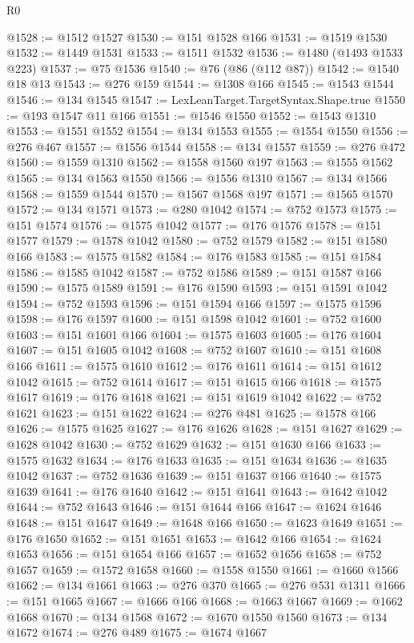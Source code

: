 \begin{lexlean}{R0}
\begin{coremodule}
@1528 := @1512 @1527
@1530 := @151 @1528 @166
@1531 := @1519 @1530
@1532 := @1449 @1531
@1533 := @1511 @1532
@1536 := @1480 (@1493 @1533 @223)
@1537 := @75 @1536
@1540 := @76 (@86 (@112 @87))
@1542 := @1540 @18 @13
@1543 := @276 @159
@1544 := @1308 @166
@1545 := @1543 @1544
@1546 := @134 @1545
@1547 := LexLeanTarget.TargetSyntax.Shape.true
@1550 := @193 @1547 @11 @166
@1551 := @1546 @1550
@1552 := @1543 @1310
@1553 := @1551 @1552
@1554 := @134 @1553
@1555 := @1554 @1550
@1556 := @276 @467
@1557 := @1556 @1544
@1558 := @134 @1557
@1559 := @276 @472
@1560 := @1559 @1310
@1562 := @1558 @1560 @197
@1563 := @1555 @1562
@1565 := @134 @1563 @1550
@1566 := @1556 @1310
@1567 := @134 @1566
@1568 := @1559 @1544
@1570 := @1567 @1568 @197
@1571 := @1565 @1570
@1572 := @134 @1571
@1573 := @280 @1042
@1574 := @752 @1573
@1575 := @151 @1574
@1576 := @1575 @1042
@1577 := @176 @1576
@1578 := @151 @1577
@1579 := @1578 @1042
@1580 := @752 @1579
@1582 := @151 @1580 @166
@1583 := @1575 @1582
@1584 := @176 @1583
@1585 := @151 @1584
@1586 := @1585 @1042
@1587 := @752 @1586
@1589 := @151 @1587 @166
@1590 := @1575 @1589
@1591 := @176 @1590
@1593 := @151 @1591 @1042
@1594 := @752 @1593
@1596 := @151 @1594 @166
@1597 := @1575 @1596
@1598 := @176 @1597
@1600 := @151 @1598 @1042
@1601 := @752 @1600
@1603 := @151 @1601 @166
@1604 := @1575 @1603
@1605 := @176 @1604
@1607 := @151 @1605 @1042
@1608 := @752 @1607
@1610 := @151 @1608 @166
@1611 := @1575 @1610
@1612 := @176 @1611
@1614 := @151 @1612 @1042
@1615 := @752 @1614
@1617 := @151 @1615 @166
@1618 := @1575 @1617
@1619 := @176 @1618
@1621 := @151 @1619 @1042
@1622 := @752 @1621
@1623 := @151 @1622
@1624 := @276 @481
@1625 := @1578 @166
@1626 := @1575 @1625
@1627 := @176 @1626
@1628 := @151 @1627
@1629 := @1628 @1042
@1630 := @752 @1629
@1632 := @151 @1630 @166
@1633 := @1575 @1632
@1634 := @176 @1633
@1635 := @151 @1634
@1636 := @1635 @1042
@1637 := @752 @1636
@1639 := @151 @1637 @166
@1640 := @1575 @1639
@1641 := @176 @1640
@1642 := @151 @1641
@1643 := @1642 @1042
@1644 := @752 @1643
@1646 := @151 @1644 @166
@1647 := @1624 @1646
@1648 := @151 @1647
@1649 := @1648 @166
@1650 := @1623 @1649
@1651 := @176 @1650
@1652 := @151 @1651
@1653 := @1642 @166
@1654 := @1624 @1653
@1656 := @151 @1654 @166
@1657 := @1652 @1656
@1658 := @752 @1657
@1659 := @1572 @1658
@1660 := @1558 @1550
@1661 := @1660 @1566
@1662 := @134 @1661
@1663 := @276 @370
@1665 := @276 @531 @1311
@1666 := @151 @1665
@1667 := @1666 @166
@1668 := @1663 @1667
@1669 := @1662 @1668
@1670 := @134 @1568
@1672 := @1670 @1550 @1560
@1673 := @134 @1672
@1674 := @276 @489
@1675 := @1674 @1667

\end{coremodule}
\end{lexlean}
